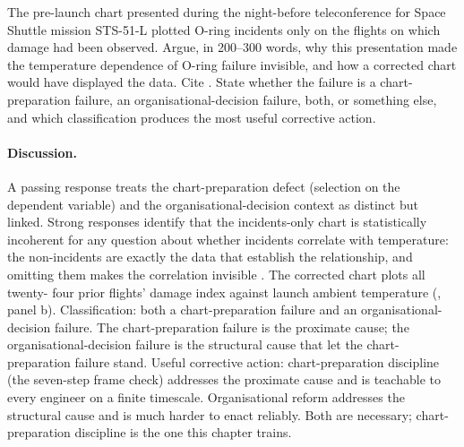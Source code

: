 \begin{exercise}
The pre-launch chart presented during the night-before teleconference
for Space Shuttle mission STS-51-L plotted O-ring incidents only on
the flights on which damage had been observed. Argue, in 200--300
words, why this presentation made the temperature dependence of
O-ring failure invisible, and how a corrected chart would have
displayed the data. Cite \cite{acc:nasa-challenger}. State whether
the failure is a chart-preparation failure, an
organisational-decision failure, both, or something else, and which
classification produces the most useful corrective action.

\paragraph{Discussion.}
A passing response treats the chart-preparation defect (selection
on the dependent variable) and the organisational-decision context
as distinct but linked. Strong responses identify that the
incidents-only chart is statistically incoherent for any question
about whether incidents correlate with temperature: the
non-incidents are exactly the data that establish the relationship,
and omitting them makes the correlation invisible
\cite{acc:nasa-challenger}. The corrected chart plots all twenty-
four prior flights' damage index against launch ambient temperature
(, panel b). Classification:
both a chart-preparation failure and an organisational-decision
failure. The chart-preparation failure is the proximate cause; the
organisational-decision failure is the structural cause that let
the chart-preparation failure stand. Useful corrective action:
chart-preparation discipline (the seven-step frame check)
addresses the proximate cause and is teachable to every engineer
on a finite timescale. Organisational reform addresses the
structural cause and is much harder to enact reliably. Both are
necessary; chart-preparation discipline is the one this chapter
trains.
\end{exercise}

